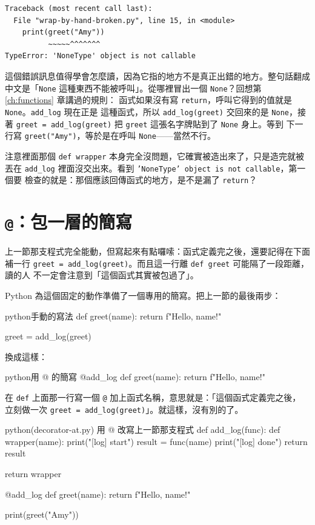 \begin{verbatim}
Traceback (most recent call last):
  File "wrap-by-hand-broken.py", line 15, in <module>
    print(greet("Amy"))
          ~~~~~^^^^^^^
TypeError: 'NoneType' object is not callable
\end{verbatim}

這個錯誤訊息值得學會怎麼讀，因為它指的地方不是真正出錯的地方。整句話翻成中文是「\texttt{None}
這種東西不能被呼叫」。從哪裡冒出一個 \texttt{None}？回想第 \ref{ch:functions} 章講過的規則：
函式如果沒有寫 \texttt{return}，呼叫它得到的值就是 \texttt{None}。\texttt{add\_log} 現在正是
這種函式，所以 \texttt{add\_log(greet)} 交回來的是 \texttt{None}，接著
\texttt{greet = add\_log(greet)} 把 \texttt{greet} 這張名字牌貼到了 \texttt{None} 身上。等到
下一行寫 \texttt{greet("Amy")}，等於是在呼叫 \texttt{None}——當然不行。

注意裡面那個 \texttt{def wrapper} 本身完全沒問題，它確實被造出來了，只是造完就被丟在
\texttt{add\_log} 裡面沒交出來。看到 \texttt{'NoneType' object is not callable}，第一個要
檢查的就是：那個應該回傳函式的地方，是不是漏了 \texttt{return}？

\section{\texttt{@}：包一層的簡寫}
\label{sec:decorator}

上一節那支程式完全能動，但寫起來有點囉嗦：函式定義完之後，還要記得在下面補一行
\texttt{greet = add\_log(greet)}。而且這一行離 \texttt{def greet} 可能隔了一段距離，讀的人
不一定會注意到「這個函式其實被包過了」。

Python 為這個固定的動作準備了一個專用的簡寫。把上一節的最後兩步：

\begin{code}{python}{手動的寫法}
def greet(name):
    return f"Hello, {name}!"


greet = add_log(greet)
\end{code}

換成這樣：

\begin{code}{python}{用 @ 的簡寫}
@add_log
def greet(name):
    return f"Hello, {name}!"
\end{code}

在 \texttt{def} 上面那一行寫一個 \texttt{@} 加上函式名稱，意思就是：「這個函式定義完之後，
立刻做一次 \texttt{greet = add\_log(greet)}」。就這樣，沒有別的了。

\begin{example}{python}{(decorator-at.py) 用 @ 改寫上一節那支程式}
def add_log(func):
    def wrapper(name):
        print("[log] start")
        result = func(name)
        print("[log] done")
        return result

    return wrapper


@add_log
def greet(name):
    return f"Hello, {name}!"


print(greet("Amy"))
\end{example}

